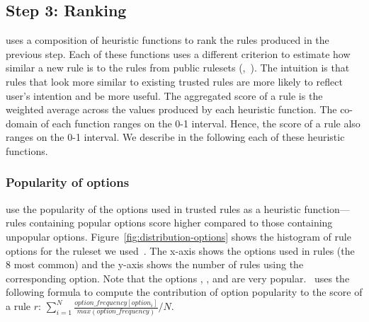 \documentclass[conference]{IEEEtran}
\begin{document}


\subsection{Step 3: Ranking}
\label{sec:ranking}

\tname{} uses a composition of heuristic functions to rank the rules
produced in the previous step. Each of these functions uses a
different criterion to estimate how similar a new rule is to the rules
from public rulesets (\eg{},~\cite{emerging-threats-open}). The
intuition is that rules that look more similar to existing trusted
rules are more likely to reflect user's intention and be more
useful. The aggregated score of a rule is the weighted average across
the values produced by each heuristic function. The co-domain of each
function ranges on the 0-1 interval. Hence, the score of a rule also
ranges on the 0-1 interval. We describe in the following each of these
heuristic functions.



\subsubsection{\label{sec:popularity-options}Popularity of options}

\tname{} use the popularity of the options used in trusted rules as a
heuristic function---rules containing popular options score higher
compared to those containing unpopular
options. Figure~\ref{fig:distribution-options} shows the histogram of
rule options for the ruleset we used~\cite{emerging-threats-open}. The
x-axis shows the options used in rules (the 8 most common) and the
y-axis shows the number of rules using the corresponding option. Note
that the options , , and 
are very popular. \tname\ uses the following formula to compute the
contribution of option popularity to the score of a rule $r$:
\indent
$\sum_{i=1}^{N}\frac{\mathit{option\_frequency[option_i]}}{\mathit{max(option\_frequency)}}/N$.
\end{document}
